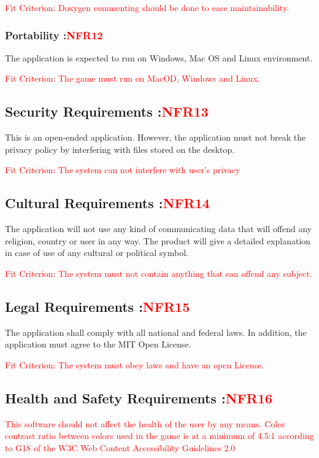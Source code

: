 \documentclass[12pt, titlepage]{article}
\begin{document}
\textcolor{red}{Fit Criterion: Doxygen commenting should be done to ease maintainability.}
\subsubsection{Portability :\textcolor{red}{NFR12}}

The application is expected to run on Windows, Mac OS and Linux environment.

\textcolor{red}{Fit Criterion: The game must run on MacOD, Windows and Linux.}
\subsection{Security Requirements :\textcolor{red}{NFR13}}

This is an open-ended application. However, the application must not break the privacy policy by interfering with files stored on the desktop. 

\textcolor{red}{Fit Criterion: The system can not interfere with user's privacy}
\subsection{Cultural Requirements :\textcolor{red}{NFR14}}

The application will not use any kind of communicating data that will offend any religion, country or user in any way. The product will give a detailed explanation in case of use of any cultural or political symbol.

\textcolor{red}{Fit Criterion: The system must not contain anything that can offend any subject.}
\subsection{Legal Requirements :\textcolor{red}{NFR15}}

The application shall comply with all national and federal laws. In addition, the application must agree to the MIT Open License.

\textcolor{red}{Fit Criterion: The system must obey laws and have an open License.}
\subsection{Health and Safety Requirements :\textcolor{red}{NFR16}}

\textcolor{red}{This software should not affect the health of the user by any means. Color contrast ratio between colors used in the game  is at a minimum of 4.5:1 according to G18 of the W3C Web Content Accessibility Guidelines 2.0}
\end{document}
